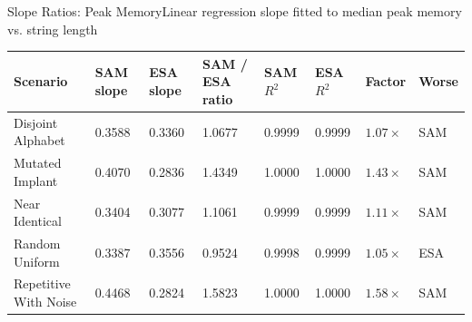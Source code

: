 \begin{benchmarktable}{Slope Ratios: Peak Memory}{Linear regression slope fitted to median peak memory vs. string length }
\begin{tabularx}{\textwidth}{|X|X|X|X|X|X|X|X|}
\toprule
Scenario & SAM slope & ESA slope & SAM / ESA ratio & SAM $R^2$ & ESA $R^2$ & Factor & Worse \\
\midrule
Disjoint Alphabet & 0.3588 & 0.3360 & 1.0677 & 0.9999 & 0.9999 & $1.07\times$ & SAM \\
\hline
Mutated Implant & 0.4070 & 0.2836 & 1.4349 & 1.0000 & 1.0000 & $1.43\times$ & SAM \\
\hline
Near Identical & 0.3404 & 0.3077 & 1.1061 & 0.9999 & 0.9999 & $1.11\times$ & SAM \\
\hline
Random Uniform & 0.3387 & 0.3556 & 0.9524 & 0.9998 & 0.9999 & $1.05\times$ & ESA \\
\hline
Repetitive With Noise & 0.4468 & 0.2824 & 1.5823 & 1.0000 & 1.0000 & $1.58\times$ & SAM \\
\bottomrule
\end{tabularx}
\end{benchmarktable}